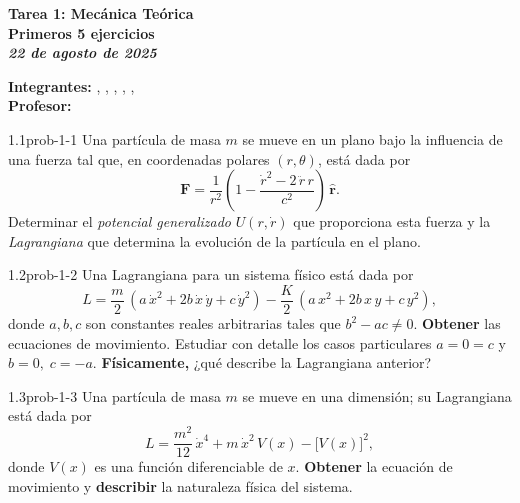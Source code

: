 






\begin{Large}
    \textsf{\textbf{Tarea 1: Mecánica Teórica}}\\
    
    \textcolor{trueblue}{\textbf{Primeros 5 ejercicios}}\\
    
    \textcolor{Apple Green}{\textbf{\textit{22 de agosto de 2025}}}
    
\end{Large}\vspace{0.5cm}

\textsf{\textbf{Integrantes:}} , , , , , \\
\textsf{\textbf{Profesor:}} 

\vspace{2ex}

\begin{problema}{1.1}{prob-1-1}
Una partícula de masa $m$ se mueve en un plano bajo la influencia de una fuerza tal que, en coordenadas polares $(r,\theta)$, está dada por
\[
\mathbf F=\frac{1}{r^{2}}\left(1-\frac{\dot r^{2}-2\,\ddot r\, r}{c^{2}}\right)\,\hat{\mathbf r}.
\]
Determinar el \textit{potencial generalizado} $U(r,\dot r)$ que proporciona esta fuerza y la \textit{Lagrangiana} que determina la evolución de la partícula en el plano.
\end{problema}

\begin{problema}{1.2}{prob-1-2}
Una Lagrangiana para un sistema físico está dada por
\[
L=\frac{m}{2}\,(a\,\dot x^{2}+2b\,\dot x\,\dot y+c\,\dot y^{2})-\frac{K}{2}\,(a\,x^{2}+2b\,x\,y+c\,y^{2}),
\]
donde $a,b,c$ son constantes reales arbitrarias tales que $b^{2}-ac\neq 0$. \textbf{Obtener} las ecuaciones de movimiento. Estudiar con detalle los casos particulares $a=0=c$ y $b=0,\;c=-a$. \textbf{Físicamente,} ¿qué describe la Lagrangiana anterior?
\end{problema}

\begin{problema}{1.3}{prob-1-3}
Una partícula de masa $m$ se mueve en una dimensión; su Lagrangiana está dada por
\[
L=\frac{m^{2}}{12}\,\dot x^{4}+m\,\dot x^{2}\,V(x)-\big[V(x)\big]^{2},
\]
donde $V(x)$ es una función diferenciable de $x$. \textbf{Obtener} la ecuación de movimiento y \textbf{describir} la naturaleza física del sistema.
\end{problema}

